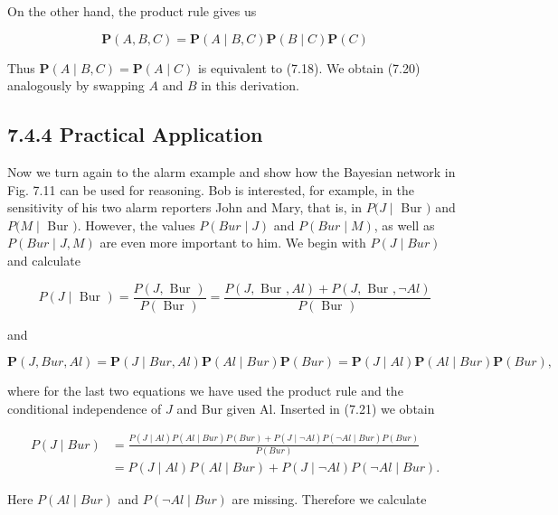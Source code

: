 \documentclass[10pt]{article}
\begin{document}
On the other hand, the product rule gives us

$$
\boldsymbol{P}(A, B, C)=\boldsymbol{P}(A \mid B, C) \boldsymbol{P}(B \mid C) \boldsymbol{P}(C)
$$

Thus $\boldsymbol{P}(A \mid B, C)=\boldsymbol{P}(A \mid C)$ is equivalent to (7.18). We obtain (7.20) analogously by swapping $A$ and $B$ in this derivation.

\subsection*{7.4.4 Practical Application}
Now we turn again to the alarm example and show how the Bayesian network in Fig. 7.11 can be used for reasoning. Bob is interested, for example, in the sensitivity of his two alarm reporters John and Mary, that is, in $P(J \mid$ Bur $)$ and $P(M \mid$ Bur $)$. However, the values $P(B u r \mid J)$ and $P(B u r \mid M)$, as well as $P(B u r \mid J, M)$ are even more important to him. We begin with $P(J \mid B u r)$ and calculate


\begin{equation*}
P(J \mid \text { Bur })=\frac{P(J, \text { Bur })}{P(\text { Bur })}=\frac{P(J, \text { Bur }, A l)+P(J, \text { Bur }, \neg A l)}{P(\text { Bur })} \tag{7.21}
\end{equation*}


and


\begin{equation*}
\boldsymbol{P}(J, B u r, A l)=\boldsymbol{P}(J \mid B u r, A l) \boldsymbol{P}(A l \mid B u r) \boldsymbol{P}(B u r)=\boldsymbol{P}(J \mid A l) \boldsymbol{P}(A l \mid B u r) \boldsymbol{P}(B u r), \tag{7.22}
\end{equation*}


where for the last two equations we have used the product rule and the conditional independence of $J$ and Bur given Al. Inserted in (7.21) we obtain


\begin{align*}
P(J \mid B u r) & =\frac{P(J \mid A l) P(A l \mid B u r) P(B u r)+P(J \mid \neg A l) P(\neg A l \mid B u r) P(B u r)}{P(B u r)}  \tag{7.23}\\
& =P(J \mid A l) P(A l \mid B u r)+P(J \mid \neg A l) P(\neg A l \mid B u r) .
\end{align*}


Here $P(A l \mid B u r)$ and $P(\neg A l \mid B u r)$ are missing. Therefore we calculate
\end{document}
